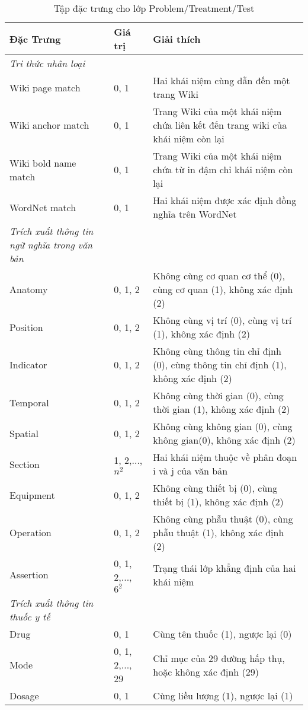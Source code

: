\begin{table}[th]
\centering
\caption{Tập đặc trưng cho lớp Problem/Treatment/Test \label{tab:ProbTreatTestFeatures}}
\footnotesize\sffamily

\begin{tabularx}{\textwidth}{@{}P{\raggedright}{0.3}lL@{}}
\toprule 
\textbf{Đặc Trưng} & \textbf{Giá trị} & \textbf{Giải thích}\\
\midrule
\textit{Tri thức nhân loại}\\
Wiki page match & 0, 1 & Hai khái niệm cùng dẫn đến một trang Wiki\\
Wiki anchor match & 0, 1 & Trang Wiki của một khái niệm chứa liên kết đến trang wiki của khái niệm còn lại\\
Wiki bold name match & 0, 1 & Trang Wiki của một khái niệm chứa từ in đậm chỉ khái niệm còn lại\\
WordNet match & 0, 1 & Hai khái niệm được xác định đồng nghĩa trên WordNet\\
\textit{Trích xuất thông tin ngữ nghĩa trong văn bản}\\
Anatomy & 0, 1, 2 & Không cùng cơ quan cơ thể (0), cùng cơ quan (1), không xác định (2)\\
Position & 0, 1, 2 & Không cùng vị trí (0), cùng vị trí (1), không xác định (2)\\
Indicator & 0, 1, 2 & Không cùng thông tin chỉ định (0), cùng thông tin chỉ định (1), không xác định (2)\\
Temporal & 0, 1, 2 & Không cùng thời gian (0), cùng thời gian (1), không xác định (2)\\
Spatial & 0, 1, 2 & Không cùng không gian (0), cùng không gian(0), không xác định (2)\\
Section & 1, 2,..., $n^{2}$ & Hai khái niệm thuộc về phân đoạn i và j của văn bản\\
Equipment & 0, 1, 2 & Không cùng thiết bị (0), cùng thiết bị (1), không xác định (2)\\
Operation & 0, 1, 2 & Không cùng phẫu thuật (0), cùng phẫu thuật (1), không xác định (2)\\
Assertion & 0, 1, 2,..., $6^{2}$ & Trạng thái lớp khẳng định của hai khái niệm\\
\textit{Trích xuất thông tin thuốc y tế}\\
Drug & 0, 1 & Cùng tên thuốc (1), ngược lại (0)\\
Mode & 0, 1, 2,..., 29 & Chỉ mục của 29 đường hấp thụ, hoặc không xác định (29)\\
Dosage & 0, 1 & Cùng liều lượng (1), ngược lại (1)\\

\end{tabularx}
\end{table}
